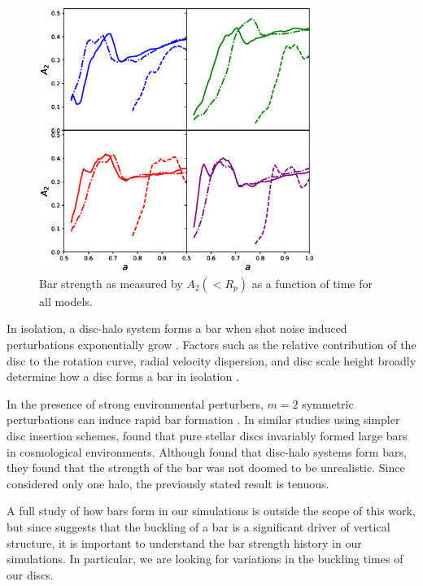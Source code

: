 \begin{figure}
	\centering
	\includegraphics[width=0.8\textwidth]{../figures/a_2_all_models_four_panel.eps}
	\caption{Bar strength as measured by $A_2(<R_p)$ as a function of time for all models.} \label{fig:a_2}
\end{figure}



In isolation, a disc-halo system forms a bar when shot noise induced perturbations exponentially grow \citep{EfstathiouShotNoise}. Factors such as the relative contribution of the disc to the rotation curve, radial velocity dispersion, and disc scale height broadly determine how a disc forms a bar in isolation \citep{AthanassoulaSellwood1986,ChristodoulouStability1995, Klypin2009, Sellwood2013, bauer2018b}. 

In the presence of strong environmental perturbers, $m=2$ symmetric perturbations can induce rapid bar formation \citep{gauthier_2006, kazantzidis2008, purcell2011, bauer2018b}. In similar studies using simpler disc insertion schemes, \citet{debuhr_2012,ys_2015} found that pure stellar discs invariably formed large bars in cosmological environments. Although \citet{bauer2018b} found that disc-halo systems form bars, they found that the strength of the bar was not doomed to be unrealistic. Since \citet{bauer2018b} considered only one halo, the previously stated result is tenuous. 

A full study of how bars form in our simulations is outside the scope of this work, but since \citet{bar_buckling_echo} suggests that the buckling of a bar is a significant driver of vertical structure, it is important to understand the bar strength history in our simulations. In particular, we are looking for variations in the buckling times of our discs.

